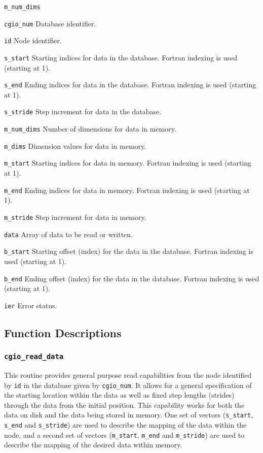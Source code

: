 \begin{Ventryi}{\texttt{m\_num\_dims}}\raggedright
\item [\texttt{cgio\_num}]
      Database identifier.
\item [\texttt{id}]
      Node identifier.
\item [\texttt{s\_start}]
      Starting indices for data in the database.
      Fortran indexing is used (starting at 1).
\item [\texttt{s\_end}]
      Ending indices for data in the database.
      Fortran indexing is used (starting at 1).
\item [\texttt{s\_stride}]
      Step increment for data in the database.
\item [\texttt{m\_num\_dims}]
      Number of dimensions for data in memory.
\item [\texttt{m\_dims}]
      Dimension values for data in memory.
\item [\texttt{m\_start}]
      Starting indices for data in memory.
      Fortran indexing is used (starting at 1).
\item [\texttt{m\_end}]
      Ending indices for data in memory.
      Fortran indexing is used (starting at 1).
\item [\texttt{m\_stride}]
      Step increment for data in memory.
\item [\texttt{data}]
      Array of data to be read or written.
\item [\texttt{b\_start}]
      Starting offset (index) for the data in the database.
      Fortran indexing is used (starting at 1).
\item [\texttt{b\_end}]
      Ending offset (index) for the data in the database.
      Fortran indexing is used (starting at 1).
\item [\texttt{ier}]
      Error status.
\end{Ventryi}

\subsection{Function Descriptions}

\subsubsection{\texttt{cgio\_read\_data}} \label{read_data}
    \noindent
    This routine provides general purpose read capabilities from the
    node identified by \texttt{id} in the database given by \texttt{cgio\_num}.
    It allows for a general specification of the starting location within
    the data as well as fixed step lengths (strides) through the data from
    the initial position.
    This capability works for both the data on disk and the data being
    stored in memory. One set of vectors (\texttt{s\_start},
    \texttt{s\_end} and \texttt{s\_stride}) are used to describe the mapping
    of the data within the node, and a second set of vectors
    (\texttt{m\_start}, \texttt{m\_end} and \texttt{m\_stride}) are used to
    describe the mapping of the desired data within memory.


